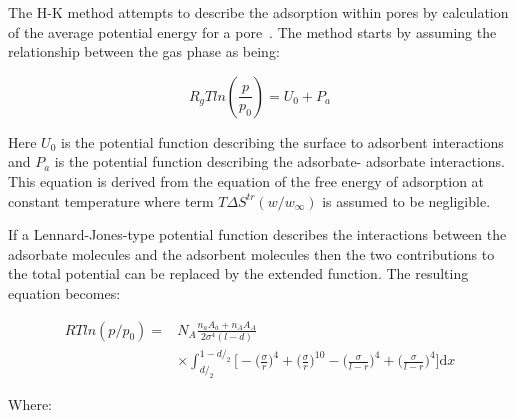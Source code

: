 The H-K method attempts to describe the adsorption within pores by calculation
of the average potential energy for a pore~\cite{horvathMethodCalculationEffective1983}.
The method starts by assuming the
relationship between the gas phase as being:

\begin{equation}
    R_g T ln(\frac{p}{p_0}) = U_0 + P_a
\end{equation}

Here \(U_0\) is the potential function describing the surface to adsorbent
interactions and \(P_a\) is the potential function describing the adsorbate-
adsorbate interactions. This equation is derived from the equation of the free energy
of adsorption at constant temperature where term \(T \Delta S^{tr}(w/w_{\infty})\)
is assumed to be negligible.

If a Lennard-Jones-type potential function describes the interactions between the
adsorbate molecules and the adsorbent molecules then the two contributions to the
total potential can be replaced by the extended function. The resulting equation becomes:

\begin{align}
    RTln(p/p_0) =   & N_A\frac{n_a A_a + n_A A_A}{2 \sigma^{4}(l-d)} \\
                    & \times \int_{d/_2}^{1-d/_2}
                        \Big[
                        - \Big(\frac{\sigma}{r}\Big)^{4}
                        + \Big(\frac{\sigma}{r}\Big)^{10}
                        - \Big(\frac{\sigma}{l-r}\Big)^{4}
                        + \Big(\frac{\sigma}{l-r}\Big)^{4}
                        \Big] \mathrm{d}x
\end{align}

Where:

